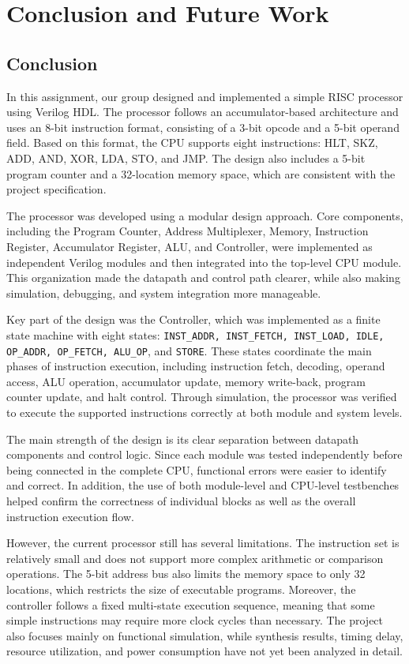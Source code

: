 \section{Conclusion and Future Work}\label{sec:conclusion} %
\subsection{Conclusion}
In this assignment, our group designed and implemented a simple RISC processor using Verilog HDL. The processor follows an accumulator-based architecture and uses an 8-bit instruction format, consisting of a 3-bit opcode and a 5-bit operand field. Based on this format, the CPU supports eight instructions: HLT, SKZ, ADD, AND, XOR, LDA, STO, and JMP. The design also includes a 5-bit program counter and a 32-location memory space, which are consistent with the project specification.

The processor was developed using a modular design approach. Core components, including the Program Counter, Address Multiplexer, Memory, Instruction Register, Accumulator Register, ALU, and Controller, were implemented as independent Verilog modules and then integrated into the top-level CPU module. This organization made the datapath and control path clearer, while also making simulation, debugging, and system integration more manageable.

Key part of the design was the Controller, which was implemented as a finite state machine with eight states: \texttt{INST\_ADDR, INST\_FETCH, INST\_LOAD, IDLE, OP\_ADDR, OP\_FETCH, ALU\_OP}, and \texttt{STORE}. These states coordinate the main phases of instruction execution, including instruction fetch, decoding, operand access, ALU operation, accumulator update, memory write-back, program counter update, and halt control. Through simulation, the processor was verified to execute the supported instructions correctly at both module and system levels.

The main strength of the design is its clear separation between datapath components and control logic. Since each module was tested independently before being connected in the complete CPU, functional errors were easier to identify and correct. In addition, the use of both module-level and CPU-level testbenches helped confirm the correctness of individual blocks as well as the overall instruction execution flow.

However, the current processor still has several limitations. The instruction set is relatively small and does not support more complex arithmetic or comparison operations. The 5-bit address bus also limits the memory space to only 32 locations, which restricts the size of executable programs. Moreover, the controller follows a fixed multi-state execution sequence, meaning that some simple instructions may require more clock cycles than necessary. The project also focuses mainly on functional simulation, while synthesis results, timing delay, resource utilization, and power consumption have not yet been analyzed in detail.


